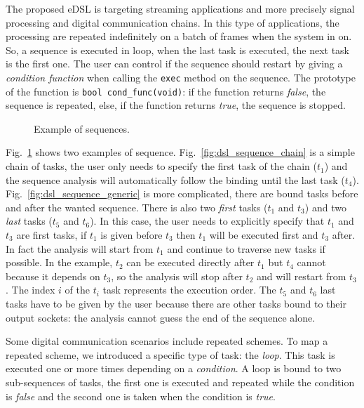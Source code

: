 The proposed eDSL is targeting streaming applications and more precisely signal
processing and digital communication chains. In this type of applications, the
processing are repeated indefinitely on a batch of frames when the system in on.
So, a sequence is executed in loop, when the last task is executed, the next
task is the first one. The user can control if the sequence should restart by
giving a \emph{condition function} when calling the \verb|exec| method on the
sequence. The prototype of the function is \verb|bool cond_func(void)|: if the
function returns \emph{false}, the sequence is repeated, else, if the function
returns \emph{true}, the sequence is stopped.

\begin{figure}[htp]
  \centering
  \quad
  \caption{Example of sequences.}
  \label{fig:dsl_sequence}
\end{figure}

Fig.~\ref{fig:dsl_sequence} shows two examples of sequence.
Fig.~\ref{fig:dsl_sequence_chain} is a simple chain of tasks, the user only
needs to specify the first task of the chain ($t_1$) and the sequence analysis
will automatically follow the binding until the last task ($t_4$).
Fig.~\ref{fig:dsl_sequence_generic} is more complicated, there are bound tasks
before and after the wanted sequence. There is also two \emph{first} tasks
($t_1$ and $t_3$) and two \emph{last} tasks ($t_5$ and $t_6$). In this case, the
user needs to explicitly specify that $t_1$ and $t_3$ are first tasks, if $t_1$
is given before $t_3$ then $t_1$ will be executed first and $t_3$ after. In fact
the analysis will start from $t_1$ and continue to traverse new tasks if
possible. In  the example, $t_2$ can be executed directly after $t_1$ but $t_4$
cannot because it depends on $t_3$, so the analysis will stop after $t_2$ and
will restart from $t_3$. The index $i$ of the $t_i$ task represents the
execution order. The $t_5$ and $t_6$ last tasks have to be given by the user
because there are other tasks bound to their output sockets: the analysis cannot
guess the end of the sequence alone.

Some digital communication scenarios include repeated schemes. To map a repeated
scheme, we introduced a specific type of task: the \emph{loop}. This task is
executed one or more times depending on a \emph{condition}. A loop is bound to
two sub-sequences of tasks, the first one is executed and repeated while the
condition is \emph{false} and the second one is taken when the condition is
\emph{true}.

